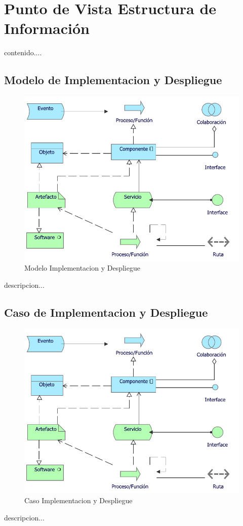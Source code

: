 \section{Punto de Vista Estructura de Información}
contenido....
\subsection{Modelo de Implementacion y Despliegue}
\begin{figure}[h!]
	\centering
	\includegraphics[width=.5\linewidth]{imgs/modelo/Implementacion}
	\caption{Modelo Implementacion y Despliegue}
\end{figure}
descripcion...

\newpage

\subsection{Caso  de Implementacion y Despliegue}
\begin{figure}[h!]
	\centering
	\includegraphics[width=.5\linewidth]{imgs/caso/Implementacion}
	\caption{Caso Implementacion y Despliegue}
\end{figure}
descripcion...